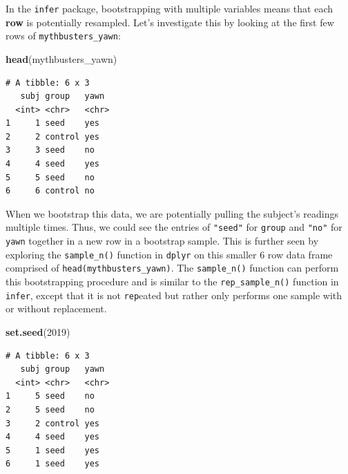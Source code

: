 \documentclass[12pt,]{krantz}
\makeatletter
\newenvironment{Shaded}{\begin{snugshade}}{\end{snugshade}}
\newcommand{\KeywordTok}[1]{\textcolor[rgb]{0.27,0.27,0.27}{\textbf{#1}}}
\newcommand{\DataTypeTok}[1]{\textcolor[rgb]{0.27,0.27,0.27}{#1}}
\newcommand{\DecValTok}[1]{\textcolor[rgb]{0.06,0.06,0.06}{#1}}
\newcommand{\StringTok}[1]{\textcolor[rgb]{0.5,0.5,0.5}{#1}}
\newcommand{\OtherTok}[1]{\textcolor[rgb]{0.37,0.37,0.37}{#1}}
\newcommand{\OperatorTok}[1]{\textcolor[rgb]{0.43,0.43,0.43}{\textbf{#1}}}
\newcommand{\NormalTok}[1]{#1}
\newenvironment{kframe}{%
\medskip{}
\setlength{\fboxsep}{.8em}
 \def\at@end@of@kframe{}%
 \ifinner\ifhmode%
  \def\at@end@of@kframe{\end{minipage}}%
  \begin{minipage}{\columnwidth}%
 \fi\fi%
 \def\FrameCommand##1{\hskip\@totalleftmargin \hskip-\fboxsep
 \colorbox{shadecolor}{##1}\hskip-\fboxsep
     \hskip-\linewidth \hskip-\@totalleftmargin \hskip\columnwidth}%
 \MakeFramed {\advance\hsize-\width
   \@totalleftmargin\z@ \linewidth\hsize
   \@setminipage}}%
 {\par\unskip\endMakeFramed%
 \at@end@of@kframe}
\renewenvironment{Shaded}{\begin{kframe}}{\end{kframe}}
\theoremstyle{definition}
\theoremstyle{definition}
\theoremstyle{definition}
\theoremstyle{remark}
\makeatother
\begin{document}
In the \texttt{infer} package, bootstrapping with multiple variables
means that each \textbf{row} is potentially resampled. Let's investigate
this by looking at the first few rows of \texttt{mythbusters\_yawn}:

\begin{Shaded}
\begin{Highlighting}[]
\KeywordTok{head}\NormalTok{(mythbusters_yawn)}
\end{Highlighting}
\end{Shaded}

\begin{verbatim}
# A tibble: 6 x 3
   subj group   yawn 
  <int> <chr>   <chr>
1     1 seed    yes  
2     2 control yes  
3     3 seed    no   
4     4 seed    yes  
5     5 seed    no   
6     6 control no   
\end{verbatim}

When we bootstrap this data, we are potentially pulling the subject's
readings multiple times. Thus, we could see the entries of
\texttt{"seed"} for \texttt{group} and \texttt{"no"} for \texttt{yawn}
together in a new row in a bootstrap sample. This is further seen by
exploring the \texttt{sample\_n()} function in \texttt{dplyr} on this
smaller 6 row data frame comprised of \texttt{head(mythbusters\_yawn)}.
The \texttt{sample\_n()} function can perform this bootstrapping
procedure and is similar to the \texttt{rep\_sample\_n()} function in
\texttt{infer}, except that it is not \texttt{rep}eated but rather only
performs one sample with or without replacement.

\begin{Shaded}
\begin{Highlighting}[]
\KeywordTok{set.seed}\NormalTok{(}\DecValTok{2019}\NormalTok{)}
\end{Highlighting}
\end{Shaded}

\begin{Shaded}
\end{Shaded}

\begin{verbatim}
# A tibble: 6 x 3
   subj group   yawn 
  <int> <chr>   <chr>
1     5 seed    no   
2     5 seed    no   
3     2 control yes  
4     4 seed    yes  
5     1 seed    yes  
6     1 seed    yes  
\end{verbatim}
\end{document}
